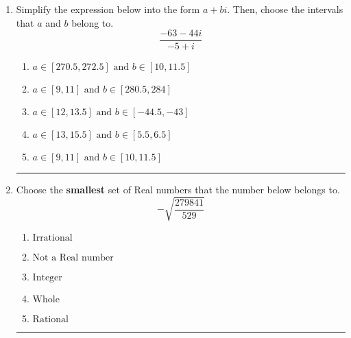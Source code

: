 \documentclass[14pt]{extbook}
\newcommand{\litem}[1]{\item#1\hspace*{-1cm}\rule{\textwidth}{0.4pt}}
\begin{document}
\begin{enumerate}
{\begin{enumerate}[label=\Alph*.]
\end{enumerate} }
\litem{
Simplify the expression below into the form $a+bi$. Then, choose the intervals that $a$ and $b$ belong to.\[ \frac{-63 - 44 i}{-5 + i} \]\begin{enumerate}[label=\Alph*.]
\item \( a \in [270.5, 272.5] \text{ and } b \in [10, 11.5] \)
\item \( a \in [9, 11] \text{ and } b \in [280.5, 284] \)
\item \( a \in [12, 13.5] \text{ and } b \in [-44.5, -43] \)
\item \( a \in [13, 15.5] \text{ and } b \in [5.5, 6.5] \)
\item \( a \in [9, 11] \text{ and } b \in [10, 11.5] \)

\end{enumerate} }
\litem{
Choose the \textbf{smallest} set of Real numbers that the number below belongs to.\[ -\sqrt{\frac{279841}{529}} \]\begin{enumerate}[label=\Alph*.]
\item \( \text{Irrational} \)
\item \( \text{Not a Real number} \)
\item \( \text{Integer} \)
\item \( \text{Whole} \)
\item \( \text{Rational} \)

\end{enumerate} }
\end{enumerate}
\end{document}
